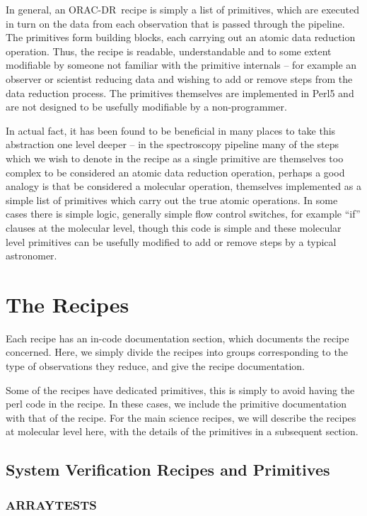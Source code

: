 \documentclass[twoside,11pt]{article}
\renewcommand{\_}{\texttt{\symbol{95}}}
\newcommand{\ORACDR}{{\footnotesize ORAC-DR}}
\begin{document}
In general, an \ORACDR\ recipe is simply a list of primitives, which
are executed in turn on the data from each observation that is passed
through the pipeline. The primitives form building blocks, each
carrying out an atomic data reduction operation. Thus, the recipe is
readable, understandable and to some extent modifiable by someone not
familiar with the primitive internals -- for example an observer or
scientist reducing data and wishing to add or remove steps from the
data reduction process. The primitives themselves are implemented in
Perl5 and are not designed to be usefully modifiable by a
non-programmer.

In actual fact, it has been found to be beneficial in many places to
take this abstraction one level deeper -- in the spectroscopy pipeline
many of the steps which we wish to denote in the recipe as a single
primitive are themselves too complex to be considered an atomic data
reduction operation, perhaps a good analogy is that be considered a
molecular operation, themselves implemented as a simple list of
primitives which carry out the true atomic operations. In some cases
there is simple logic, generally simple flow control switches, for
example ``if'' clauses at the molecular level, though this code is
simple and these molecular level primitives can be usefully modified
to add or remove steps by a typical astronomer.

\section{The Recipes}

Each recipe has an in-code documentation section, which documents the
recipe concerned. Here, we simply divide the recipes into groups
corresponding to the type of observations they reduce, and give the
recipe documentation.

Some of the recipes have dedicated primitives, this is simply to
avoid having the perl code in the recipe. In these cases, we include
the primitive documentation with that of the recipe. For the main
science recipes, we will describe the recipes at molecular level
here, with the details of the primitives in a subsequent section.

\subsection{System Verification Recipes and Primitives}

\subsubsection{ARRAY\_TESTS}
\end{document}
